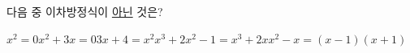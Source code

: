 다음 중 이차방정식이 \underline{아닌} 것은?
\begin{choicesii}{$x^2=0$}{$x^2+3x=0$}{$3x+4=x^2$}{$x^3+2x^2-1=x^3+2x$}{$x^2-x=(x-1)(x+1)$}\end{choicesii}
